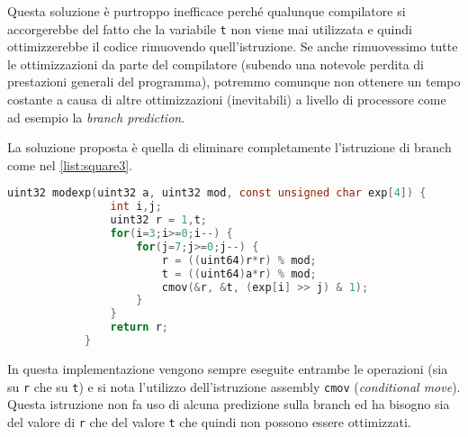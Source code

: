 		Questa soluzione è purtroppo inefficace perché qualunque compilatore si accorgerebbe del fatto che la variabile \texttt{t} non viene mai utilizzata e quindi ottimizzerebbe il codice rimuovendo quell'istruzione. Se anche rimuovessimo tutte le ottimizzazioni da parte del compilatore (subendo una notevole perdita di prestazioni generali del programma), potremmo comunque non ottenere un tempo costante a causa di altre ottimizzazioni (inevitabili) a livello di processore come ad esempio la \emph{branch prediction}.
		
		La soluzione proposta è quella di eliminare completamente l'istruzione di branch come nel \cref{list:square3}.
		
		\begin{center}
			\begin{lstlisting}[language={C},caption={RSA, esponenziazione modulare v3},label={list:square3}]
			uint32 modexp(uint32 a, uint32 mod, const unsigned char exp[4]) {
				int i,j;
				uint32 r = 1,t;
				for(i=3;i>=0;i--) {
					for(j=7;j>=0;j--) {
						r = ((uint64)r*r) % mod;
						t = ((uint64)a*r) % mod;
						cmov(&r, &t, (exp[i] >> j) & 1);
					}
				}
				return r;
			}
			\end{lstlisting}
		\end{center}
	
		In questa implementazione vengono sempre eseguite entrambe le operazioni (sia su \texttt{r} che su \texttt{t}) e si nota l'utilizzo dell'istruzione assembly \texttt{cmov} (\emph{conditional move}). Questa istruzione non fa uso di alcuna predizione sulla branch ed ha bisogno sia del valore di \texttt{r} che del valore \texttt{t} che quindi non possono essere ottimizzati.
		